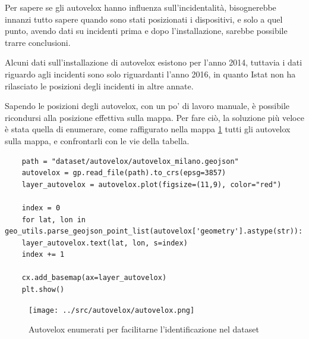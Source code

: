 \documentclass[a4paper]{report}
\begin{document}
Per sapere se gli autovelox hanno influenza sull'incidentalità, 
bisognerebbe innanzi tutto sapere quando sono stati posizionati i dispositivi, e solo a quel punto, 
avendo dati su incidenti prima e dopo l'installazione, sarebbe possibile trarre conclusioni.

Alcuni dati sull'installazione di autovelox esistono per l'anno 2014, tuttavia i dati 
riguardo agli incidenti sono solo riguardanti l'anno 2016, in quanto Istat non ha rilasciato 
le posizioni degli incidenti in altre annate.

Sapendo le posizioni degli autovelox, con un po' di lavoro manuale, è possibile ricondursi alla 
posizione effettiva sulla mappa.
Per fare ciò, la soluzione più veloce è stata quella di enumerare, 
come raffigurato nella mappa \ref{fig:autovelox-indici} tutti gli autovelox sulla mappa, 
e confrontarli con le vie della tabella.

\begin{lstlisting}
    path = "dataset/autovelox/autovelox_milano.geojson"
    autovelox = gp.read_file(path).to_crs(epsg=3857)
    layer_autovelox = autovelox.plot(figsize=(11,9), color="red")
    
    index = 0
    for lat, lon in geo_utils.parse_geojson_point_list(autovelox['geometry'].astype(str)):
    layer_autovelox.text(lat, lon, s=index)
    index += 1
    
    cx.add_basemap(ax=layer_autovelox)
    plt.show()
\end{lstlisting}

\begin{figure}
    \texttt{[image: ../src/autovelox/autovelox.png]}
    \caption{Autovelox enumerati per facilitarne l'identificazione nel dataset}
    \label{fig:autovelox-indici}
\end{figure}
\end{document}
